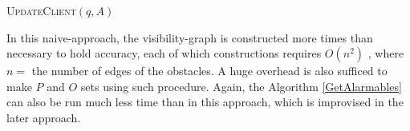 \documentclass{sig-alternate}
\begin{document}
\begin{algorithm}
\caption{\textsc{UpdateClient}$(q, A)$}

    
	  {
	}
\label{UpdateClient}
\end{algorithm}


In this naive-approach, the visibility-graph is constructed more times than necessary to hold accuracy, each of which constructions requires $O(n^2)$ \cite{mur}, where $n =$ the number of edges of the obstacles. A huge overhead is also sufficed to make $P$ and $O$ sets using such procedure. Again, the Algorithm \ref{GetAlarmables} can also be run much less time than in this approach, which is improvised in the later approach.
\end{document}
